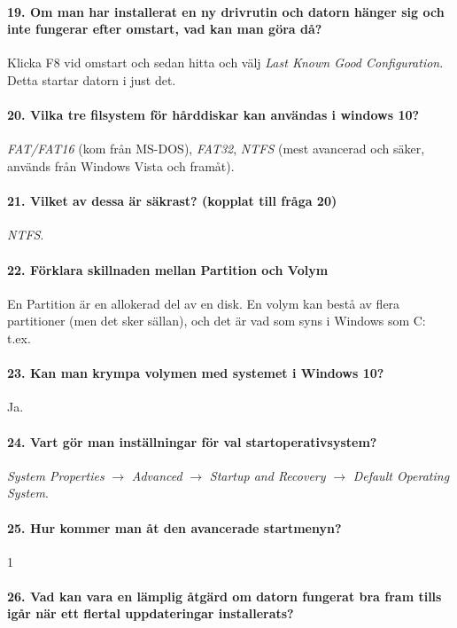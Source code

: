 \paragraph{19. Om man har installerat en ny drivrutin och datorn hänger sig och inte fungerar efter omstart, vad kan man göra då?} Klicka F8 vid omstart och sedan hitta och välj \textit{Last Known Good Configuration}. Detta startar datorn i just det.

\paragraph{20. Vilka tre filsystem för hårddiskar kan användas i windows 10?} \textit{FAT/FAT16} (kom från MS-DOS), \textit{FAT32}, \textit{NTFS} (mest avancerad och säker, används från Windows Vista och framåt).

\paragraph{21. Vilket av dessa är säkrast? (kopplat till fråga 20)} \textit{NTFS}.

\paragraph{22. Förklara skillnaden mellan Partition och Volym}
En Partition är en allokerad del av en disk. En volym kan bestå av flera partitioner (men det sker sällan), och det är vad som syns i Windows som C: t.ex.

\paragraph{23. Kan man krympa volymen med systemet i Windows 10?} Ja. 

\paragraph{24. Vart gör man inställningar för val startoperativsystem?}
\textit{System Properties} $\rightarrow$ \textit{Advanced} $\rightarrow$ \textit{Startup and Recovery} $\rightarrow$ \textit{Default Operating System}.

\paragraph{25. Hur kommer man åt den avancerade startmenyn?}
1

\paragraph{26. Vad kan vara en lämplig åtgärd om datorn fungerat bra fram tills igår när ett flertal uppdateringar installerats?}

